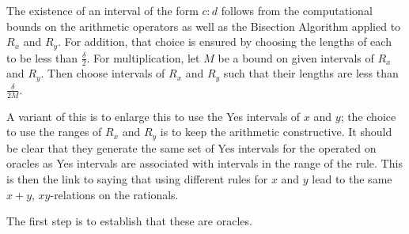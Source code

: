 \documentclass[12pt]{article}
\begin{document}
The existence of an interval of the form $c:d$ follows from the computational bounds on the arithmetic operators as well as the Bisection Algorithm applied to $R_x$ and $R_y$. For addition, that choice is ensured by choosing the lengths of each to be less than $\frac{\delta}{2}$. For multiplication, let $M$ be a bound on given intervals of $R_x$ and $R_y$. Then choose intervals of $R_x$ and $R_y$ such that their lengths are less than $\frac{\delta}{2M}$. 

 A variant of this is to enlarge this to use the Yes intervals of $x$ and $y$; the choice to use the ranges of $R_x$ and $R_y$ is to keep the arithmetic constructive. It should be clear that they generate the same set of Yes intervals for the operated on oracles as Yes intervals are associated with intervals in the range of the rule. This is then the link to saying that using different rules for $x$ and $y$ lead to the same $x+y$, $xy$-relations on the rationals. 

The first step is to establish that these are oracles. 
\end{document}
